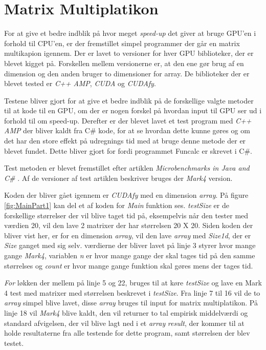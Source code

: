 \section{Matrix Multiplatikon}
\label{MM}
For at give et bedre indblik på hvor meget \textit{speed-up} det giver at bruge GPU'en i forhold til CPU'en, er der fremstillet simpel programmer der går en matrix multikapion igennem. Der er lavet to versioner for hver GPU biblioteker, der er blevet kigget på. Forskellen mellem versionerne er, at den ene gør brug af en dimension og den anden bruger to dimensioner for array. De biblioteker der er blevet tested er \textit{C++ AMP}, \textit{CUDA} og \textit{CUDAfy}.

Testene bliver gjort for at give et bedre indblik på de forskellige valgte metoder til at kode til en GPU, om der er nogen forskel på hvordan input til GPU ser ud i forhold til om speed-up. Derefter er der blevet lavet et test program med \textit{C++ AMP} der bliver kaldt fra C\# kode, for at se hvordan dette kunne gøres og om det har den store effekt på udregnings tid med at bruge denne metode der er blevet fundet. Dette bliver gjort for fordi programmet Funcalc er skrevet i C\#.

Test metoden er blevet fremstillet efter artiklen \textit{Microbenchmarks in Java and C\#} \cite{Microbenchmarks}. Af de versioner af test artiklen beskriver bruges der \textit{Mark4} version.

Koden der bliver gået igennem er \textit{CUDAfy} med en dimension \textit{array}. På figure \ref{fig:MainPart1} kan del et af koden for \textit{Main} funktion ses. \textit{testSize} er de forskellige størrelser der vil blive taget tid på, eksempelvis når den tester med værdien 20, vil den lave 2 matrixer der har størrelsen 20 X 20. Siden koden der bliver vist her, er for en dimension \textit{array}, vil den lave \textit{array} med \textit{Size1d}, der er \textit{Size} ganget med sig selv. værdierne der bliver lavet på linje 3 styrer hvor mange gange \textit{Mark4}, variablen \textit{n} er hvor mange gange der skal tages tid på den samme størrelses og  \textit{count} er hvor mange gange funktion skal gøres mens der tages tid. 

\textit{For} løkken der mellem på linje 5 og 22, bruges til at køre \textit{testSize} og lave en Mark 4 test med matrixer med størrelsen beskrevet i \textit{testSize}. Fra linje 7 til 16 vil de to \textit{array} simpel blive lavet, disse \textit{array} bruges til input for matrix multiplatikon. På linje 18 vil \textit{Mark4} blive kaldt, den vil returner to tal empirisk middelværdi og standard
afvigelsen, der vil blive lagt ned i et \textit{array} \textit{result}, der kommer til at holde resultaterne fra alle testende for dette program, samt størrelsen der blev testet.

